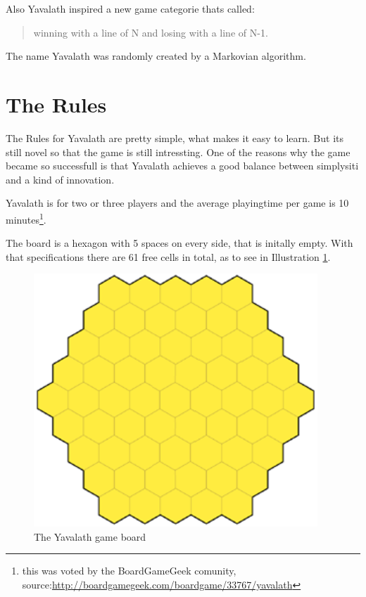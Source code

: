 \documentclass[german]{report}
\begin{document}
Also Yavalath inspired a new game categorie thats called:
\begin{quote}
	winning with a line of N and losing with a line of N-1.
\end{quote}

The name Yavalath was randomly created by a Markovian algorithm.

\section{The Rules}
The Rules for Yavalath are pretty simple, what makes it easy to learn. But its
still novel so that the game is still intressting. 
One of the reasons why the game became so successfull is that Yavalath achieves
a good balance between simplysiti and a kind of innovation.

Yavalath is for two or three players and the average playingtime per game is 10 minutes\footnote{this was voted by the BoardGameGeek comunity, source:\url{http://boardgamegeek.com/boardgame/33767/yavalath}}.

The board is a hexagon with 5 spaces on every side, that is initally empty.
With that specifications there are 61 free cells in total, as to see in Illustration \ref{fig:yav_board}.

\begin{figure}[ht]
\centering
\includegraphics[width=0.95\textwidth]{Abbildungen/yav_emptyBoard.png}
\caption[The Yavalath game board, Source:\cite{yvalathHP}]{The Yavalath game board}
\label{fig:yav_board}
\end{figure}
\end{document}
